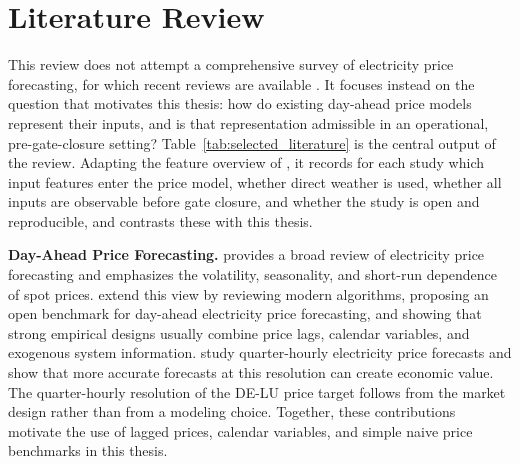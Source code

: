 \section{Literature Review}
\label{sec:literature}

This review does not attempt a comprehensive survey of electricity price
forecasting, for which recent reviews are available
\cite{lago2021forecasting,weron2014electricity}. It focuses instead on the
question that motivates this thesis: how do existing day-ahead price models
represent their inputs, and is that representation admissible in an
operational, pre-gate-closure setting? Table~\ref{tab:selected_literature} is
the central output of the review. Adapting the feature overview of
\textcite{eiser2026operational}, it records for each study which input features
enter the price model, whether direct weather is used, whether all inputs are
observable before gate closure, and whether the study is open and reproducible,
and contrasts these with this thesis.

\noindent\textbf{Day-Ahead Price Forecasting.}
\textcite{weron2014electricity} provides a broad review of electricity price
forecasting and emphasizes the volatility, seasonality, and short-run
dependence of spot prices. \textcite{lago2021forecasting} extend this view by
reviewing modern algorithms, proposing an open benchmark for day-ahead
electricity price forecasting, and showing that strong empirical designs
usually combine price lags, calendar variables, and exogenous system
information.
\textcite{kath2018quarterHourly} study quarter-hourly electricity price
forecasts and show that more accurate forecasts at this resolution can create
economic value. The quarter-hourly resolution of the \mbox{DE-LU} price target
follows from the market design rather than from a modeling choice. Together,
these contributions motivate the use of lagged prices, calendar variables, and
simple naive price benchmarks in this thesis.

